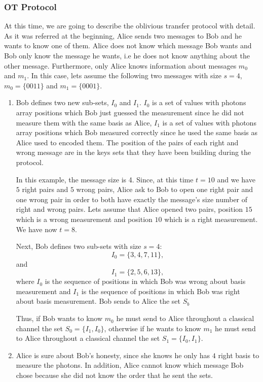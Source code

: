 \subsubsection{OT Protocol}
    At this time, we are going to describe the oblivious transfer protocol with detail. As it was referred at the beginning, Alice sends two messages to Bob and he wants to know one of them. Alice does not know which message Bob wants and Bob only know the message he wants, i.e he does not know anything about the other message.
    Furthermore, only Alice knows information about messages $m_{0}$ and $m_{1}$.
    In this case, lets assume the following two messages with size $s=4$, $m_{0} = \{0 0 1 1\}$ and $m_{1} = \{0 0 0 1\}$.
  \begin{enumerate}
  \item Bob defines two new sub-sets, $I_{0}$ and $I_{1}$. $I_{0}$ is a set of values with photons array positions which Bob just guessed the measurement since he did not measure them with the same basis as Alice, $I_{1}$ is a set of values with photons array positions which Bob measured correctly since he used the same basis as Alice used to encoded them. The position of the pairs of each right and wrong message are in the keys sets that they have been building during the protocol.

  In this example, the message size is 4. Since, at this time $t=10$ and we have $5$ right pairs and $5$ wrong pairs, Alice ask to Bob to open one right pair and one wrong pair in order to both have exactly the message's size number of right and wrong pairs. Lets assume that Alice opened two pairs, position $15$ which is a wrong measurement and position $10$ which is a right measurement. We have now $t=8$.

  Next, Bob defines two sub-sets with size $s=4$:
  $$I_{0}=\{3,4,7,11 \},$$
  and $$I_{1}= \{2,5,6,13 \},$$ where $I_{0}$ is the sequence of positions in which Bob was wrong about basis measurement and $I_{1}$ is the sequence of positions in which Bob was right about basis measurement. Bob sends to Alice the set $S_{b}$

  Thus, if Bob wants to know $m_{0}$ he must send to Alice throughout a classical channel the set $S_{0}=\{I_{1},I_{0} \}$, otherwise if he wants to know $m_{1}$ he must send to Alice throughout a classical channel the set $S_{1}=\{I_{0},I_{1} \}$.


  \item Alice is sure about Bob's honesty, since she knows he only has $4$ right basis to measure the photons. In addition, Alice cannot know which message Bob chose because she did not know the order that he sent the sets.


\end{enumerate}
